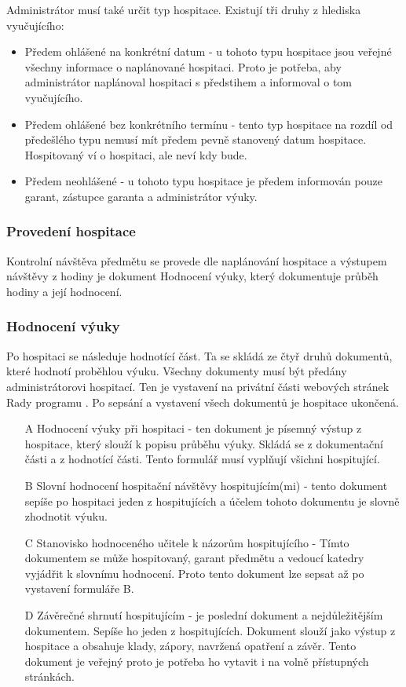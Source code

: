 Administrátor musí také určit typ hospitace. Existují tři druhy z hlediska vyučujícího:

\begin{itemize}
\item Předem ohlášené na konkrétní datum - u tohoto typu hospitace jsou veřejné všechny informace o naplánované hospitaci. Proto je potřeba, aby administrátor naplánoval hospitaci s předstihem a informoval o tom vyučujícího.
\item Předem ohlášené bez konkrétního termínu - tento typ hospitace na rozdíl od předešlého typu nemusí mít předem pevně stanovený datum hospitace. Hospitovaný  ví o hospitaci, ale neví kdy bude.
\item Předem neohlášené - u tohoto typu hospitace je předem informován pouze garant, zástupce garanta a administrátor výuky. 

\end{itemize}

\subsubsection{Provedení hospitace}
Kontrolní návštěva předmětu se provede dle naplánování hospitace a výstupem návštěvy z hodiny je dokument Hodnocení výuky, který dokumentuje průběh hodiny a její hodnocení. 

\subsubsection{Hodnocení výuky}
Po hospitaci se následuje hodnotící část. Ta se skládá ze čtyř druhů dokumentů, které hodnotí proběhlou výuku. Všechny dokumenty musí být předány administrátorovi hospitací. Ten je vystavení na privátní části webových stránek Rady programu \cite{kvalitavyukyweb}. Po sepsání a vystavení všech dokumentů je hospitace ukončená. 

\label{sec:formulare}
\begin{itemize}
\item[A] Hodnocení výuky při hospitaci - ten dokument  je písemný výstup z hospitace, který slouží k popisu průběhu výuky. Skládá se z dokumentační části a z hodnotící části. Tento formulář musí vyplňují všichni hospitující.
\item[B] Slovní hodnocení hospitační návštěvy hospitujícím(mi) - tento dokument sepíše po hospitaci jeden z hospitujících a účelem tohoto dokumentu je slovně zhodnotit výuku. 
\item[C] Stanovisko hodnoceného učitele k názorům hospitujícího - Tímto dokumentem se může hospitovaný, garant předmětu a vedoucí katedry vyjádřit k slovnímu hodnocení. Proto tento dokument lze sepsat až po vystavení formuláře B.
\item[D] Závěrečné shrnutí hospitujícím - je poslední dokument a nejdůležitějším dokumentem. Sepíše ho jeden z hospitujících. Dokument slouží jako výstup z hospitace a obsahuje klady, zápory, navržená opatření a závěr. Tento dokument je veřejný proto je potřeba ho vytavit i na volně přístupných stránkách.
\end{itemize}